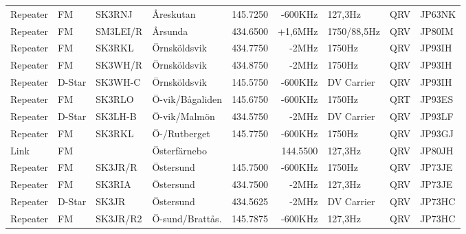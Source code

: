 \documentclass[10pt,swedish,a4paper,twoside]{article}
\begin{document}
\begin{landscape}
\begin{longtable}{llllrrlcl}
	Repeater          & FM           & SK3RNJ        & Åreskutan        &          145.7250 &        -600KHz & 127,3Hz         &       QRV       & JP63NK           \\
	Repeater          & FM           & SM3LEI/R      & Årsunda          &          434.6500 &        +1,6MHz & 1750/88,5Hz     &       QRV       & JP80IM           \\
	Repeater          & FM           & SK3RKL        & Örnsköldsvik     &          434.7750 &          -2MHz & 1750Hz          &       QRV       & JP93IH           \\
	Repeater          & FM           & SK3WH/R       & Örnsköldsvik     &          434.8750 &          -2MHz & 1750Hz          &       QRV       & JP93IH           \\
	Repeater          & D-Star       & SK3WH-C       & Örnsköldsvik     &          145.5750 &        -600KHz & DV Carrier      &       QRV       & JP93IH           \\
	Repeater          & FM           & SK3RLO        & Ö-vik/Bågaliden  &          145.6750 &        -600KHz & 1750Hz          &       QRT       & JP93ES           \\
	Repeater          & D-Star       & SK3LH-B       & Ö-vik/Malmön     &          434.5750 &          -2MHz & DV Carrier      &       QRV       & JP93LF           \\
	Repeater          & FM           & SK3RKL        & Ö-/Rutberget     &          145.7750 &        -600KHz & 1750Hz          &       QRV       & JP93GJ           \\
	Link              & FM           &               & Österfärnebo     &                   &       144.5500 & 127,3Hz         &       QRV       & JP80JH           \\
	Repeater          & FM           & SK3JR/R       & Östersund        &          145.7500 &        -600KHz & 1750Hz          &       QRV       & JP73JE           \\
	Repeater          & FM           & SK3RIA        & Östersund        &          434.7500 &          -2MHz & 127,3Hz         &       QRV       & JP73JE           \\
	Repeater          & D-Star       & SK3JR         & Östersund        &          434.5625 &          -2MHz & DV Carrier      &       QRV       & JP73HC           \\
	Repeater          & FM           & SK3JR/R2      & Ö-sund/Brattås.  &          145.7875 &        -600KHz & 127,3Hz         &       QRV       & JP73HC
\end{longtable}
\normalsize

\end{landscape}
\end{document}
